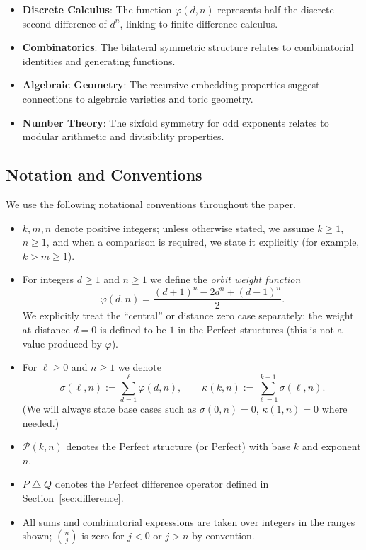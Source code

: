 \documentclass[11pt]{article}
\DeclareMathOperator{\diffop}{\triangle}
\newcommand{\diff}{\mathbin{\diffop}}
\newcommand{\perfect}{\mathcal{P}}
\begin{document}
\begin{itemize}
    \item \textbf{Discrete Calculus}: The function $\varphi(d,n)$ represents half the discrete second difference of $d^n$, linking to finite difference calculus.
    \item \textbf{Combinatorics}: The bilateral symmetric structure relates to combinatorial identities and generating functions.
    \item \textbf{Algebraic Geometry}: The recursive embedding properties suggest connections to algebraic varieties and toric geometry.
    \item \textbf{Number Theory}: The sixfold symmetry for odd exponents relates to modular arithmetic and divisibility properties.
\end{itemize}

\subsection{Notation and Conventions}
We use the following notational conventions throughout the paper.
\begin{itemize}
  \item $k,m,n$ denote positive integers; unless otherwise stated, we assume $k\ge 1$, $n\ge 1$, and when a comparison is required, we state it explicitly (for example, $k>m\ge1$).
  \item For integers $d\ge1$ and $n\ge1$ we define the \emph{orbit weight function}
  \[
    \varphi(d,n) = \frac{(d+1)^{n}-2d^{n}+(d-1)^{n}}{2}.
  \]
  We explicitly treat the ``central'' or distance zero case separately: the weight at distance $d=0$ is defined to be $1$ in the Perfect structures (this is not a value produced by $\varphi$).
  \item For $\ell\ge0$ and $n\ge1$ we denote
  \[
    \sigma(\ell,n):=\sum_{d=1}^{\ell}\varphi(d,n),
    \qquad
    \kappa(k,n):=\sum_{\ell=1}^{k-1}\sigma(\ell,n).
  \]
  (We will always state base cases such as $\sigma(0,n)=0$, $\kappa(1,n)=0$ where needed.)
  \item $\perfect(k,n)$ denotes the Perfect structure (or Perfect) with base $k$ and exponent $n$.
  \item $P \diff Q$ denotes the Perfect difference operator defined in Section~\ref{sec:difference}.
  \item All sums and combinatorial expressions are taken over integers in the ranges shown; $\binom{n}{j}$ is zero for $j<0$ or $j>n$ by convention.
\end{itemize}
\end{document}
